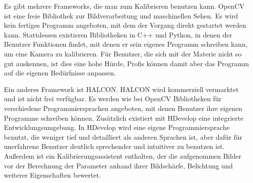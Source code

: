Es gibt mehrere Frameworks, die man zum Kalibrieren benutzen kann. OpenCV ist eine freie Bibliothek zur Bildverarbeitung und maschinellen Sehen. Es wird kein fertiges Programm angeboten, mit dem der Vorgang direkt gestartet werden kann. Stattdessen existieren Bibliotheken in C++ und Python, in denen der Benutzer Funktionen findet, mit denen er sein eigenes Programm schreiben kann, um eine Kamera zu kalibrieren. Für Benutzer, die sich mit der Materie nicht so gut auskennen, ist dies eine hohe Hürde, Profis können damit aber das Programm auf die eigenen Bedürfnisse anpassen.

Ein anderes Framework ist HALCON. HALCON wird kommerziell vermarktet und ist nicht frei verfügbar. Es werden wie bei OpenCV Bibliotheken für verschiedene Programmiersprachen angeboten, mit denen Benutzer ihre eigenen Programme schreiben können. Zusätzlich existiert mit HDevelop eine integrierte Entwicklungsumgebung. In HDevelop wird eine eigene Programmiersprache benutzt, die weniger tief und detailliert als anderen Sprachen ist, aber dafür für unerfahrene Benutzer deutlich sprechender und intuitiver zu benutzen ist. Außerdem ist ein Kalibrierungsassistent enthalten, der die aufgenommen Bilder vor der Berechnung der Parameter anhand ihrer Bildschärfe, Belichtung und weiterer Eigenschaften bewertet.